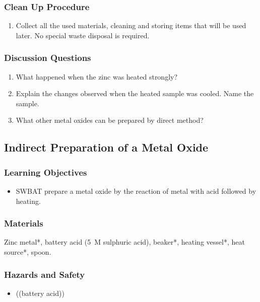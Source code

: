\subsubsection*{Clean Up Procedure}
\begin{enumerate}
\item{Collect all the used materials, cleaning and storing items that will be used later. No special waste disposal is required.}
\end{enumerate}

\subsubsection*{Discussion Questions}
\begin{enumerate}
\item{What happened when the zinc was heated strongly?}
\item{Explain the changes observed when the heated sample was cooled. Name the sample.}
\item{What other metal oxides can be prepared by direct method?}
\end{enumerate}

\subsection{Indirect Preparation of a Metal Oxide}

\subsubsection*{Learning Objectives}
\begin{itemize}
\item{SWBAT prepare a metal oxide by the reaction of metal with acid followed by heating.}
\end{itemize}

\subsubsection*{Materials}
Zinc metal*, battery acid (5~M sulphuric acid), beaker*, heating vessel*, heat source*, spoon.

\subsubsection*{Hazards and Safety}
\begin{itemize}
\item{((battery acid))}
\end{itemize}


